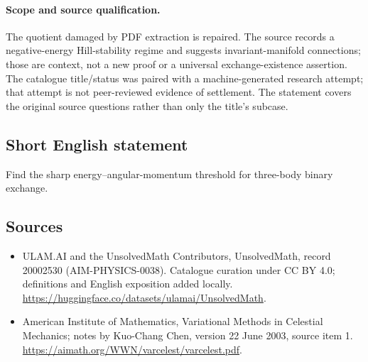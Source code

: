 \documentclass[11pt]{article}
\begin{document}
\paragraph{Scope and source qualification.}The quotient damaged by PDF extraction is repaired. The source records a negative-energy Hill-stability regime and suggests invariant-manifold connections; those are context, not a new proof or a universal exchange-existence assertion. The catalogue title/status was paired with a machine-generated research attempt; that attempt is not peer-reviewed evidence of settlement. The statement covers the original source questions rather than only the title’s subcase.
\subsection{Short English statement}
Find the sharp energy–angular-momentum threshold for three-body binary exchange.
\subsection{Sources}
\begin{itemize}
\item[\hypertarget{source:20002530:1}{S1}] ULAM.AI and the UnsolvedMath Contributors, UnsolvedMath, record 20002530 (AIM-PHYSICS-0038). Catalogue curation under CC BY 4.0; definitions and English exposition added locally.
\url{https://huggingface.co/datasets/ulamai/UnsolvedMath}.
\item[\hypertarget{source:20002530:2}{S2}] American Institute of Mathematics, Variational Methods in Celestial Mechanics; notes by Kuo-Chang Chen, version 22 June 2003, source item 1.
\url{https://aimath.org/WWN/varcelest/varcelest.pdf}.
\end{itemize}
\label{end:20002530}
\end{document}
